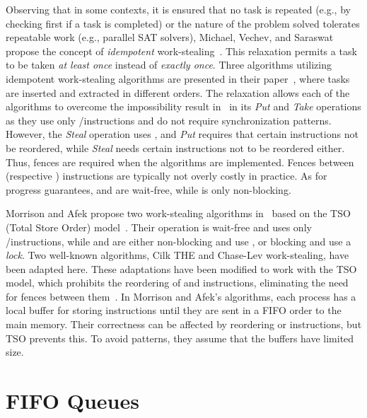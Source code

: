 Observing that in some contexts, it is ensured that no task is repeated (e.g., by checking first if a task is completed) or the nature of the problem solved tolerates repeatable work (e.g., parallel SAT solvers), Michael, Vechev, and Saraswat propose the concept of \emph{idempotent} work-stealing~\cite{maged.vechev.2009}. This relaxation permits a task to be taken \emph{at least once} instead of \emph{exactly once}. Three algorithms utilizing idempotent work-stealing algorithms are presented in their paper~\cite{maged.vechev.2009},  where tasks are inserted and extracted in different orders. The relaxation allows each of the algorithms to overcome the impossibility result in~\cite{DBLP_conf_popl_AttiyaGHKMV11} in its \emph{Put} and \emph{Take} operations as they use only \R/\W instructions and do not require \RAW synchronization patterns. However, the \emph{Steal} operation uses \CAS, and \emph{Put} requires that certain \W instructions not be reordered, while \emph{Steal} needs certain \R instructions not to be reordered either. Thus, fences are required when the algorithms are implemented. Fences between \R (respective \W) instructions are typically not overly costly in practice. As for progress guarantees, \Put and \Take are wait-free, while \Steal is only non-blocking.

Morrison and Afek propose two work-stealing algorithms in~\cite{fencefreeworkproceedings} based on the TSO (Total Store Order) model~\cite{DBLP_journals_cacm_SewellSONM10}. Their \Put operation is wait-free and uses only \R/\W instructions, while \Take and \Steal are either non-blocking and use \CAS, or blocking and use a \emph{lock}. Two well-known algorithms, Cilk THE and Chase-Lev work-stealing, have been adapted here. These adaptations have been modified to work with the TSO model, which prohibits the reordering of \W and \R instructions, eliminating the need for fences between them~\cite{circular.work.stealing, DBLP_conf_pldi_FrigoLR98}. In Morrison and Afek's algorithms, each process has a local buffer for storing \W instructions until they are sent in a FIFO order to the main memory. Their correctness can be affected by reordering \W or \R instructions, but TSO prevents this. To avoid \RAW patterns, they assume that the \W buffers have limited size.


\section{\label{section:FIFO-queues}FIFO Queues}

